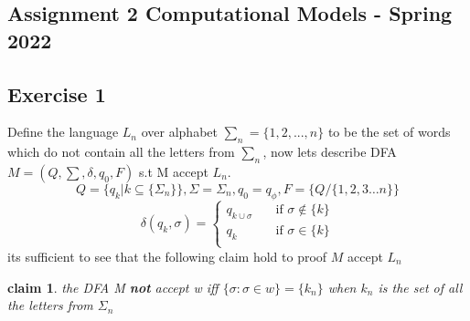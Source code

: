\documentclass[12pt]{article}
\newtheorem{claim}[theorem]{claim}
\begin{document}
\begin{center}
\section*{ Assignment 2  Computational Models
 - Spring 2022}
\end{center}
\subsection*{Exercise 1}
 Define the language $L_n$ over alphabet $\sum_n = \lbrace 1, 2, ..., n\rbrace$ to be the set of words
which do not contain all the letters from $\sum_n$, now lets describe DFA $M=(Q,\sum ,\delta,q_0,F)$ s.t M accept $L_n$.
 \[
Q=\lbrace q_k | k \subseteq \lbrace \Sigma_n \rbrace \rbrace,\Sigma =\Sigma_n,q_0={q_{\phi}},F=\lbrace Q/\lbrace 1,2,3\dots n \rbrace \rbrace
\]
\[
\delta(q_k,\sigma) = 
     \begin{cases} 
      q_{k\cup \sigma } &\quad\text{if } \sigma \not\in \lbrace k \rbrace\\
       q_k &\quad\text{if     } \sigma \in \lbrace k \rbrace \\
     \end{cases}     
\]
its sufficient to see that the following claim hold to proof $M$ accept $L_n$
\begin{claim}
the DFA M \textbf{not} accept w iff $\lbrace \sigma: \sigma \in w \rbrace =\lbrace k_n \rbrace$ when $k_n$ is the set of all the letters from $\Sigma_n$
\end{claim}
\end{document}
